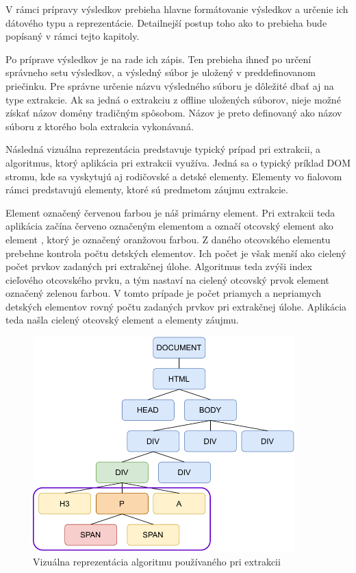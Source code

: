 V rámci prípravy výsledkov prebieha hlavne formátovanie výsledkov a určenie ich dátového typu a reprezentácie. Detailnejší postup toho ako to prebieha bude popísaný v rámci tejto kapitoly. 

Po príprave výsledkov je na rade ich zápis. Ten prebieha ihneď po určení správneho setu výsledkov, a výsledný súbor je uložený v preddefinovanom priečinku. Pre správne určenie názvu výsledného súboru je dôležité dbať aj na type extrakcie. Ak sa jedná o extrakciu z offline uložených súborov, nieje možné získať názov domény tradičným spôsobom. Názov je preto definovaný ako názov súboru z ktorého bola extrakcia vykonávaná. 

\newpage

Následná vizuálna reprezentácia predstavuje typický prípad pri extrakcii, a algoritmus, ktorý aplikácia pri extrakcii využíva. Jedná sa o typický príklad DOM stromu, kde sa vyskytujú aj rodičovské a detské elementy. Elementy vo fialovom rámci predstavujú elementy, ktoré sú predmetom záujmu extrakcie. 

Element  označený červenou farbou je náš primárny element. Pri extrakcii teda aplikácia začína červeno označeným elementom  a označí otcovský element ako element , ktorý je označený oranžovou farbou. Z daného otcovského elementu prebehne kontrola počtu detských elementov. Ich počet je však menší ako cielený počet prvkov zadaných pri extrakčnej úlohe. Algoritmus teda zvýši index cieľového otcovského prvku, a tým nastaví na cielený otcovský prvok element  označený zelenou farbou. V tomto prípade je počet priamych a nepriamych detských elementov rovný počtu zadaných prvkov pri extrakčnej úlohe. Aplikácia teda našla cielený otcovský element a elementy záujmu.

\bigskip

 \begin{figure}[hbt]
	\centering
	\includegraphics[width=0.9\textwidth]{obrazky-figures/dom.pdf}
	\caption{Vizuálna reprezentácia algoritmu používaného pri extrakcii}
	\label{domvisual}
\end{figure}

